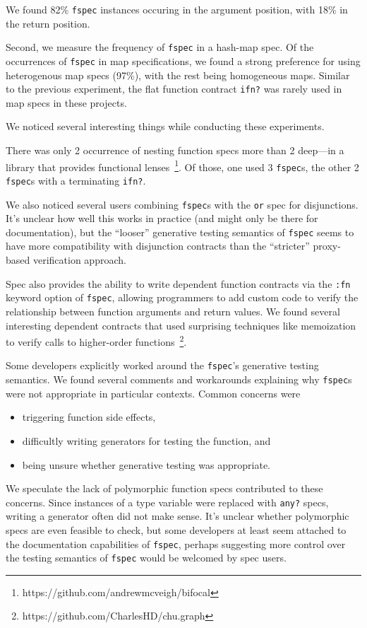 We found 82\% \texttt{fspec} instances occuring in the argument position,
with 18\% in the return position.

Second, we measure the frequency of \texttt{fspec} in a hash-map spec.
Of the occurrences of \texttt{fspec} in map specifications, 
we found a strong preference for using heterogenous map specs (97\%),
with the rest being homogeneous maps.
Similar to the previous experiment, the flat function contract \texttt{ifn?} was rarely used 
in map specs in these projects.

We noticed several interesting things while conducting these experiments.

There was only 2 occurrence of nesting function specs more than 2 deep---in a library
that provides functional lenses~\footnote{https://github.com/andrewmcveigh/bifocal}.
Of those, one used 3 \texttt{fspec}s, the other 2 \texttt{fspec}s with a terminating \texttt{ifn?}.

We also noticed several users combining \texttt{fspec}s with the \texttt{or} spec
for disjunctions. It's unclear how well this works in practice (and might only be
there for documentation), but the ``looser'' generative testing semantics of \texttt{fspec}
seems to have more compatibility with disjunction contracts than the ``stricter''
proxy-based verification approach.

Spec also provides the ability to write dependent function contracts via the \texttt{:fn}
keyword option of \texttt{fspec}, allowing programmers
to add custom code to verify the relationship between function arguments and return values.
We found several interesting dependent contracts that used surprising techniques like
memoization to verify calls to higher-order functions~\footnote{https://github.com/CharlesHD/chu.graph}.

Some developers explicitly worked around the \texttt{fspec}'s generative testing semantics.
We found several comments and workarounds explaining why \texttt{fspec}s were not
appropriate in particular contexts. Common concerns were
\\
\begin{itemize}
	\item triggering function side effects,
	\item difficultly writing generators for testing the function, and
	\item being unsure whether generative testing was appropriate.
\end{itemize}

We speculate the lack of polymorphic function specs contributed to these concerns.
Since instances of a type variable were replaced with \texttt{any?} specs, writing
a generator often did not make sense. It's unclear whether polymorphic specs are
even feasible to check, but some developers at least seem attached to the documentation
capabilities of \texttt{fspec}, perhaps suggesting more control over the testing
semantics of \texttt{fspec} would be welcomed by spec users.

